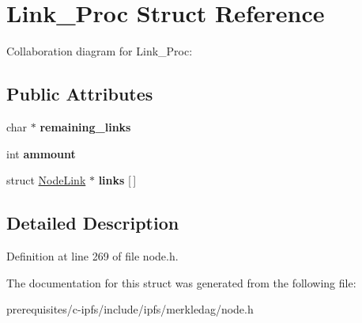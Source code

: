 \hypertarget{struct_link___proc}{}\section{Link\+\_\+\+Proc Struct Reference}
\label{struct_link___proc}


Collaboration diagram for Link\+\_\+\+Proc\+:
\subsection*{Public Attributes}
\begin{DoxyCompactItemize}
\item 
\mbox{\label{struct_link___proc_ae605b65691835b9f0e7c9926211f2f9f}} 
char $\ast$ {\bfseries remaining\+\_\+links}
\item 
\mbox{\label{struct_link___proc_a383aa0eaf1a62befc49b42fc4dfa74c7}} 
int {\bfseries ammount}
\item 
\mbox{\label{struct_link___proc_a2f0aff3340f12177220430f8c1739f32}} 
struct \mbox{\hyperlink{struct_node_link}{Node\+Link}} $\ast$ {\bfseries links} \mbox{[}$\,$\mbox{]}
\end{DoxyCompactItemize}


\subsection{Detailed Description}


Definition at line 269 of file node.\+h.



The documentation for this struct was generated from the following file\+:\begin{DoxyCompactItemize}
\item 
prerequisites/c-\/ipfs/include/ipfs/merkledag/node.\+h\end{DoxyCompactItemize}

